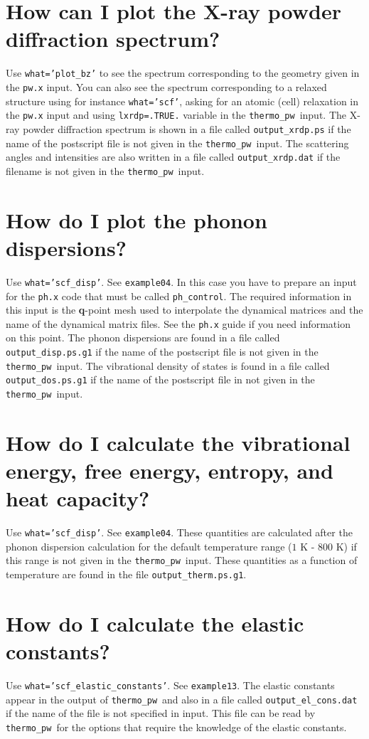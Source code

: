 \documentclass[12pt,a4paper]{article}
\def\thermo{\texttt{thermo\_pw}}
\begin{document}
\section{\color{coral}How can I plot the X-ray powder diffraction spectrum?}
Use \texttt{what='plot\_bz'} to see the spectrum corresponding to
the geometry given in the \texttt{pw.x} input. You can also see the
spectrum corresponding to a relaxed structure using for instance
\texttt{what='scf'}, asking for an atomic (cell) relaxation in the \texttt{pw.x}
input and using \texttt{lxrdp=.TRUE.} variable in the \thermo\ input.
The X-ray powder diffraction spectrum is shown in a file called 
\texttt{output\_xrdp.ps} if the name of the postscript file is not
given in the \thermo\ input. The scattering angles and intensities
are also written in a file called \texttt{output\_xrdp.dat} if the filename
is not given in the \thermo\ input.

\section{\color{coral}How do I plot the phonon dispersions?}
Use \texttt{what='scf\_disp'}. See \texttt{example04}. In this case you
have to prepare an input for the \texttt{ph.x} code that must be
called \texttt{ph\_control}. The required information in this input
is the {\bf q}-point mesh used to interpolate the dynamical matrices and
the name of the dynamical matrix files.
See the \texttt{ph.x} guide if you need information on this point.
The phonon dispersions are found in a file called \texttt{output\_disp.ps.g1}
if the name of the postscript file is not given in the \thermo\ input.
The vibrational density of states is found in a file called 
\texttt{output\_dos.ps.g1} if the name of the postscript file in not
given in the \thermo\ input.

\section{\color{coral}How do I calculate the vibrational energy, free energy, entropy, and heat capacity?}
Use \texttt{what='scf\_disp'}. See \texttt{example04}. These quantities
are calculated after the phonon dispersion calculation for the default 
temperature range ($1$ K - $800$ K) if this range
is not given in the \thermo\ input. These quantities 
as a function of temperature are found in the file \texttt{output\_therm.ps.g1}.

\section{\color{coral}How do I calculate the elastic constants?}
Use \texttt{what='scf\_elastic\_constants'}. See \texttt{example13}. The
elastic constants appear in the output of \thermo\ and also in a file
called \texttt{output\_el\_cons.dat} if the name of the file is not
specified in input. This file can be read by \thermo\ for the options
that require the knowledge of the elastic constants.
\end{document}
